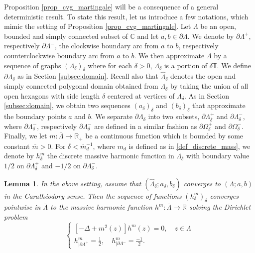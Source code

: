 \documentclass{article}
\newtheorem{lemma}[theorem]{Lemma}
\theoremstyle{definition}
\theoremstyle{remark}
\theoremstyle{remark}
\begin{document}
Proposition \ref{prop_cvg_martingale} will be a consequence of a general deterministic result. To state this result, let us introduce a few notations, which mimic the setting of Proposition \ref{prop_cvg_martingale}. Let $\Lambda$ be an open, bounded and simply connected subset of $\mathbb{C}$ and let $a, b \in \partial \Lambda$. We denote by $\partial \Lambda^{+}$, respectively $\partial \Lambda^{-}$, the clockwise boundary arc from $a$ to $b$, respectively counterclockwise boundary arc from $a$ to $b$. We then approximate $\Lambda$ by a sequence of graphs $(\Lambda_{\delta})_{\delta}$ where for each $\delta > 0$, $\Lambda_{\delta}$ is a portion of $\delta \mathbb{T}$. We define $\partial \Lambda_{\delta}$ as in Section \ref{subsec:domain}. Recall also that $\hat \Lambda_{\delta}$ denotes the open and simply connected polygonal domain obtained from $\Lambda_{\delta}$ by taking the union of all open hexagons with side length $\delta$ centered at vertices of $\Lambda_{\delta}$. As in Section \ref{subsec:domain}, we obtain two sequences $(a_{\delta})_{\delta}$ and $(b_{\delta})_{\delta}$ that approximate the boundary points $a$ and $b$. We separate $\partial \Lambda_{\delta}$ into two subsets, $\partial \Lambda_{\delta}^{+}$ and $\partial \Lambda_{\delta}^{-}$, where $\partial \Lambda_{\delta}^{-}$, respectively $\partial \Lambda_{\delta}^{-}$ are defined in a similar fashion as $\partial \Omega_{\delta}^{+}$ and $\partial \Omega_{\delta}^{-}$. Finally, we let $m: \overline{\Lambda} \to \mathbb{R}_{+}$ be a continuous function which is bounded by some constant $\overline{m} >0$. For $\delta < \overline{m}_d^{-1}$, where $m_{d}$ is defined as in \eqref{def_discrete_mass}, we denote by $h_{\delta}^m$ the discrete massive harmonic function in $\Lambda_{\delta}$ with boundary value $1/2$ on $\partial \Lambda_{\delta}^{+}$ and $-1/2$ on $\partial \Lambda_{\delta}^{-}$.

\begin{lemma}
In the above setting, assume that $(\hat \Lambda_{\delta}; a_{\delta}, b_{\delta})$ converges to $(\Lambda;a,b)$ in the Carath\'eodory sense. Then the sequence of functions $(h_{\delta}^m)_{\delta}$ converges pointwise in $\overline{\Lambda}$ to the massive harmonic function $h^m: \overline{\Lambda} \to \mathbb{R}$ solving the Dirichlet problem
\begin{equation*}
\begin{cases}
    [-\Delta + m^2(z)]h^m(z) = 0, \quad z \in \Lambda \\
    h^m_{\vert \partial \Lambda^{+}} = \frac{1}{2}, \quad h^m_{\vert \partial \Lambda^{-}} = \frac{-1}{2}.
\end{cases}
\end{equation*}
\end{lemma}
\end{document}
